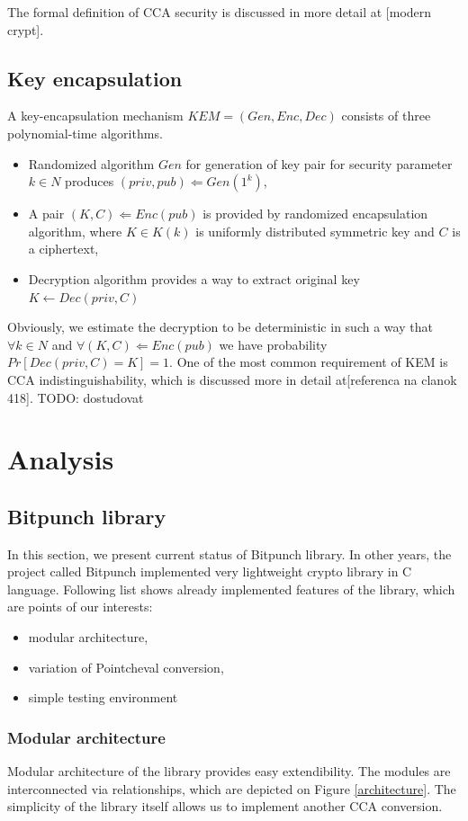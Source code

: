 \noindent The formal definition of CCA security is discussed in more detail at [modern crypt].

\subsection{Key encapsulation}
A key-encapsulation mechanism $KEM = (Gen,Enc,Dec)$ consists of three polynomial-time algorithms.
\begin{itemize}
	\item Randomized algorithm $Gen$ for generation of key pair for security parameter $k \in N$ produces $(priv,pub) \Leftarrow Gen(1^k)$,
	\item A pair $(K,C) \Leftarrow Enc(pub)$ is provided by randomized encapsulation algorithm, where $K \in K(k)$ is uniformly distributed symmetric key and $C$ is a ciphertext,
	\item Decryption algorithm provides a way to extract original key $K \leftarrow Dec(priv,C)$
\end{itemize}   

Obviously, we estimate the decryption to be deterministic in such a way that $\forall k \in N$ and $\forall (K,C) \Leftarrow Enc(pub)$ we have probability $Pr[Dec(priv,C) = K] = 1$. One of the most common requirement of KEM is  CCA indistinguishability, which is discussed more in detail at[referenca na clanok 418].
TODO: dostudovat

 
\section{Analysis}
\subsection{Bitpunch library}
In this section, we present current status of Bitpunch library. 
In other years, the project called Bitpunch implemented very lightweight crypto library in C language. Following list shows already implemented features of the library, which are points of our interests:
\begin{itemize}
	\item modular architecture,
	\item variation of Pointcheval conversion,
	\item simple testing environment
\end{itemize} 

\subsubsection{Modular architecture}
Modular architecture of the library provides easy extendibility. The modules are interconnected via relationships, which are depicted on Figure \ref{architecture}. The simplicity of the library itself allows us to implement another CCA conversion.

